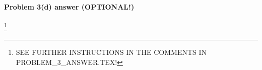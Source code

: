 \newpage

\paragraph{Problem 3(d) answer (OPTIONAL!)}\footnote
{\color{blue}
  SEE FURTHER INSTRUCTIONS IN THE COMMENTS IN PROBLEM\_3\_ANSWER.TEX!}

\begin{blue}
  





    


  

  
  
\end{blue}


